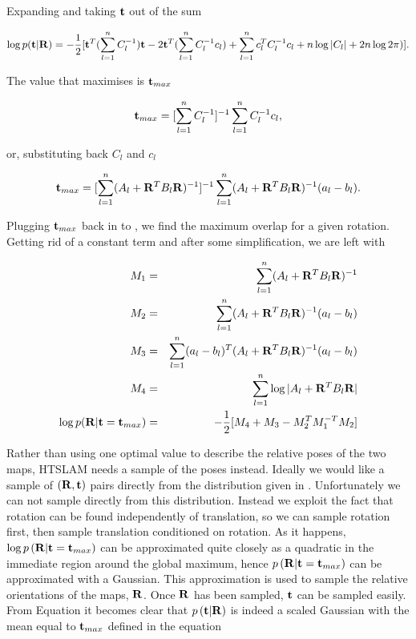Expanding and taking ${\bf t}$ out of the sum

\begin{equation}
\log p({\bf t}|{\bf R}) = -\frac{1}{2}[{\bf t}^T(\sum_{l=1}^{n}C_l^{-1}){\bf t}
- 2{\bf t}^T(\sum_{l=1}^{n}C_l^{-1}c_l)
+ \sum_{l=1}^{n}c_l^TC_l^{-1}c_l
+ n\log |C_l| + 2n \log 2\pi)].
\label{eqn:align_log_w_matrix_form_t}
\end{equation}

The value that maximises 
is ${\bf t}_{max}$

\begin{equation}
{\bf t}_{max} = [\sum_{l=1}^{n}C_l^{-1}]^{-1}\sum_{l=1}^{n}C_l^{-1}c_l,
\label{eqn:align_log_w_matrix_form_tmax0}
\end{equation}

or, substituting back $C_l$ and $c_l$

\begin{equation}
{\bf t}_{max} = [\sum_{l=1}^{n}( A_l + {\bf R}^TB_l{\bf R})^{-1}]^{-1}
\sum_{l=1}^{n}( A_l + {\bf R}^TB_l{\bf R})^{-1}(a_l-b_l).
\label{eqn:align_log_w_matrix_form_tmax}
\end{equation}

Plugging ${\bf t}_{max}$ back in to
, we find the maximum overlap
for a given rotation. Getting rid of a constant term and after some
simplification, we are left with

\begin{eqnarray}
M_1 &=& \sum_{l=1}^{n}( A_l + {\bf R}^TB_l{\bf R})^{-1}\\
M_2 &=& \sum_{l=1}^{n}( A_l + {\bf R}^TB_l{\bf R})^{-1}(a_l - b_l)\\
M_3 &=& \sum_{l=1}^{n}(a_l-b_l)^T( A_l + {\bf R}^TB_l{\bf R})^{-1}(a_l - b_l)\\
M_4 &=& \sum_{l=1}^{n}\log | A_l + {\bf R}^TB_l{\bf R} | \\
\log p({\bf R}|{\bf t}={\bf t}_{max}) &=& -\frac{1}{2}[M_4 + M_3 - M_2^TM_1^{-T}M_2]
\label{eqn:align_log_w_r_max}
\end{eqnarray}

Rather than using one optimal value to describe the relative poses of
the two maps, HTSLAM needs a sample of the poses instead. Ideally we
would like a sample of $({\bf R},{\bf t})$ pairs directly from the
distribution given in . Unfortunately we can
not sample directly from this distribution. Instead we exploit the
fact that rotation can be found independently of translation, so we
can sample rotation first, then sample translation conditioned on
rotation. As it happens, $\log  p \left( {\bf R}|{\bf t}={\bf t}_{max} \right)$
can be approximated quite closely as a quadratic in the immediate
region around the global maximum, hence $ p \left( {\bf R}|{\bf t}={\bf
t}_{max} \right)$ can be approximated with a Gaussian.  This approximation
is used to sample the relative orientations of the maps, ${\bf R}$. Once
${\bf R}$ has been sampled, ${\bf t}$ can be sampled easily. From
Equation  it becomes clear
that $ p \left( {\bf t}|{\bf R} \right)$ is indeed a scaled Gaussian with the
mean equal to ${\bf t}_{max}$ defined in the equation

